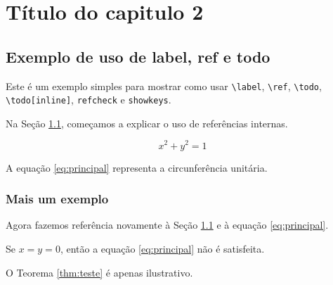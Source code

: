 \chapter{Título do capitulo 2}\label{chap2}
    

\section{Exemplo de uso de label, ref e todo}
\label{sec:introducao}

Este é um exemplo simples para mostrar como usar \texttt{\textbackslash label},
\texttt{\textbackslash ref}, \texttt{\textbackslash todo}, \texttt{\textbackslash todo[inline]},
\texttt{refcheck} e \texttt{showkeys}.


Na Seção \ref{sec:introducao}, começamos a explicar o uso de referências internas.

\begin{equation}
\label{eq:principal}
x^2+y^2=1
\end{equation}

A equação \eqref{eq:principal} representa a circunferência unitária.


\subsection{Mais um exemplo}
\label{subsec:exemplo}

Agora fazemos referência novamente à Seção \ref{sec:introducao}
e à equação \eqref{eq:principal}.

\begin{teorema}
\label{thm:teste}
Se $x=y=0$, então a equação \eqref{eq:principal} não é satisfeita.
\end{teorema}

O Teorema \ref{thm:teste} é apenas ilustrativo.


